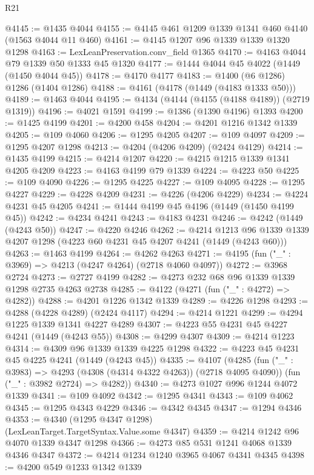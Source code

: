 \begin{lexlean}{R21}
\begin{coremodule}
@4145 := @1435 @4044
@4155 := @4145 @461 @1209 @1339 @1341 @460 @4140 (@1563 @4044 @11 @460)
@4161 := @4145 @1207 @96 @1339 @1339 @1320 @1298
@4163 := LexLeanPreservation.conv_field @1365
@4170 := @4163 @4044 @79 @1339 @50 @1333 @45 @1320
@4177 := @1444 @4044 @45 @4022 (@1449 (@1450 @4044 @45))
@4178 := @4170 @4177
@4183 := @1400 (@6 @1286) @1286 (@1404 @1286)
@4188 := @4161 (@4178 (@1449 (@4183 @1333 @50)))
@4189 := @1463 @4044
@4195 := @4134 (@4144 (@4155 (@4188 @4189)) (@2719 @1319))
@4196 := @4021 @1591
@4199 := @1386 (@1390 @4196) @1393
@4200 := @1425 @4199
@4201 := @4200 @458
@4204 := @4201 @1216 @1342 @1339
@4205 := @109 @4060
@4206 := @1295 @4205
@4207 := @109 @4097
@4209 := @1295 @4207 @1298
@4213 := @4204 (@4206 @4209) (@2424 @4129)
@4214 := @1435 @4199
@4215 := @4214 @1207
@4220 := @4215 @1215 @1339 @1341 @4205 @4209
@4223 := @4163 @4199 @79 @1339
@4224 := @4223 @50
@4225 := @109 @4090
@4226 := @1295 @4225
@4227 := @109 @4095
@4228 := @1295 @4227
@4229 := @4228 @4209
@4231 := @4226 (@4206 @4229)
@4234 := @4224 @4231 @45 @4205
@4241 := @1444 @4199 @45 @4196 (@1449 (@1450 @4199 @45))
@4242 := @4234 @4241
@4243 := @4183 @4231
@4246 := @4242 (@1449 (@4243 @50))
@4247 := @4220 @4246
@4262 := @4214
    @1213
    @96
    @1339
    @1339
    @4207
    @1298
    (@4223 @60 @4231 @45 @4207 @4241 (@1449 (@4243 @60)))
@4263 := @1463 @4199
@4264 := @4262 @4263
@4271 := @4195 (fun ("_" : @3969) => @4213 (@4247 @4264) (@2718 @4060 @4097))
@4272 := @3968 @2724
@4273 := @2727 @4199
@4282 := @4273 @232 @68 @96 @1339 @1339 @1298 @2735 @4263 @2738
@4285 := @4122 (@4271 (fun ("_" : @4272) => @4282))
@4288 := @4201 @1226 @1342 @1339
@4289 := @4226 @1298
@4293 := @4288 (@4228 @4289) (@2424 @4117)
@4294 := @4214 @1221
@4299 := @4294 @1225 @1339 @1341 @4227 @4289
@4307 := @4223 @55 @4231 @45 @4227 @4241 (@1449 (@4243 @55))
@4308 := @4299 @4307
@4309 := @4214 @1223
@4314 := @4309 @96 @1339 @1339 @4225 @1298
@4322 := @4223 @45 @4231 @45 @4225 @4241 (@1449 (@4243 @45))
@4335 := @4107
    (@4285
      (fun ("_" : @3983) => @4293 (@4308 (@4314 @4322 @4263)) (@2718 @4095 @4090))
      (fun ("_" : @3982 @2724) => @4282))
@4340 := @4273 @1027 @996 @1244 @4072 @1339
@4341 := @109 @4092
@4342 := @1295 @4341
@4343 := @109 @4062
@4345 := @1295 @4343 @4229
@4346 := @4342 @4345
@4347 := @1294 @4346
@4353 := @4340 (@1295 @4347 @1298) (LexLeanTarget.TargetSyntax.Value.some @4347)
@4359 := @4214 @1242 @96 @4070 @1339 @4347 @1298
@4366 := @4273 @85 @531 @1241 @4068 @1339 @4346 @4347
@4372 := @4214 @1234 @1240 @3965 @4067 @4341 @4345
@4398 := @4200
    @549
    @1233
    @1342
    @1339

\end{coremodule}
\end{lexlean}
